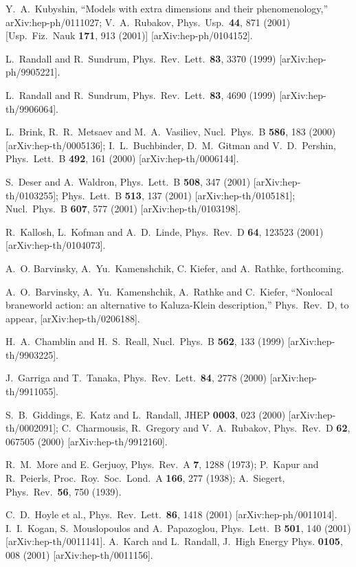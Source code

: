 \documentclass[a4paper,prl,twocolumn,amsmath,amssymb,showpacs]{revtex4}
\begin{document}
 
\begin{thebibliography}{99} 
 
Y.~A.~Kubyshin, 
``Models with extra dimensions and their phenomenology,'' 
arXiv:hep-ph/0111027; 
V.~A.~Rubakov, 
Phys.\ Usp.\  {\bf 44}, 871 (2001) 
[Usp.\ Fiz.\ Nauk {\bf 171}, 913 (2001)] 
[arXiv:hep-ph/0104152]. 
 
L.~Randall and R.~Sundrum, 
Phys.\ Rev.\ Lett.\  {\bf 83}, 3370 (1999) 
[arXiv:hep-ph/9905221]. 
 
L.~Randall and R.~Sundrum, 
Phys.\ Rev.\ Lett.\  {\bf 83}, 4690 (1999) 
[arXiv:hep-th/9906064]. 
 
L.~Brink, R.~R.~Metsaev and M.~A.~Vasiliev,
Nucl.\ Phys.\ B {\bf 586}, 183 (2000)
[arXiv:hep-th/0005136];
I.~L.~Buchbinder, D.~M.~Gitman and V.~D.~Pershin,
Phys.\ Lett.\ B {\bf 492}, 161 (2000) [arXiv:hep-th/0006144].

S.~Deser and A.~Waldron,
Phys.\ Lett.\ B {\bf 508}, 347 (2001)
[arXiv:hep-th/0103255];
Phys.\ Lett.\ B {\bf 513}, 137 (2001)
[arXiv:hep-th/0105181];
Nucl.\ Phys.\ B {\bf 607}, 577 (2001)
[arXiv:hep-th/0103198].
 
R.~Kallosh, L.~Kofman and A.~D.~Linde,  
Phys.\ Rev.\ D {\bf 64}, 123523 (2001)  
[arXiv:hep-th/0104073]. 
 
A.~O. Barvinsky, A.~Yu.~Kamenshchik, C. Kiefer, and A.~Rathke, 
forthcoming. 
 
A.~O.~Barvinsky, A.~Yu.~Kamenshchik, A.~Rathke and C.~Kiefer, 
``Nonlocal braneworld action: an alternative to Kaluza-Klein description,'' 
 Phys.\ Rev.\ D, to appear, [arXiv:hep-th/0206188]. 
 
H.~A.~Chamblin and H.~S.~Reall, 
Nucl.\ Phys.\ B {\bf 562}, 133 (1999) 
[arXiv:hep-th/9903225]. 
 
J.~Garriga and T.~Tanaka, 
Phys.\ Rev.\ Lett.\  {\bf 84}, 2778 (2000) 
[arXiv:hep-th/9911055]. 
 
S.~B.~Giddings, E.~Katz and L.~Randall, 
JHEP {\bf 0003}, 023 (2000) 
[arXiv:hep-th/0002091]; 
C.~Charmousis, R.~Gregory and V.~A.~Rubakov, 
Phys.\ Rev.\ D {\bf 62}, 067505 (2000) 
[arXiv:hep-th/9912160]. 
 
R.~M.~More and E. Gerjuoy, Phys.\ Rev.\ A {\bf 7}, 1288 (1973); 
P.~Kapur and R.~Peierls, Proc.\ Roy.\ Soc.\ Lond.\ A {\bf 166}, 277 (1938); 
A.~Siegert, Phys.\ Rev.\ {\bf 56}, 750 (1939). 
 
C.~D.~Hoyle et al.,  
Phys.\ Rev.\ Lett.\  {\bf 86}, 1418 (2001) 
[arXiv:hep-ph/0011014]. 
I.~I.~Kogan, S.~Mouslopoulos and A.~Papazoglou, 
Phys.\ Lett.\ B {\bf 501}, 140 (2001) [arXiv:hep-th/0011141].
 A.~Karch and L.~Randall, J.\ High Energy Phys. {\bf 0105}, 008 
(2001) [arXiv:hep-th/0011156].
\end{thebibliography} 
\end{document}
